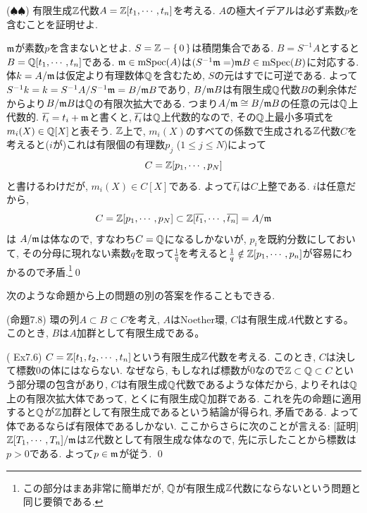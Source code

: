 \begin{egprob} ($\spadesuit\spadesuit$)
有限生成$\mathbb{Z}$代数$A=\mathbb{Z}[t_1,\cdots, t_n]$を考える. $A$の極大イデアルは必ず素数$p$を含むことを証明せよ.
\end{egprob}
\begin{egans}
$\mathfrak{m}$が素数$p$を含まないとせよ. $S=\mathbb{Z}-\set{0}$は積閉集合である. $B=S^{-1}A$とすると$B=\mathbb{Q}[t_1,\cdots,t_n]$である. $\mathfrak{m}\in \mathrm{mSpec}(A)$は$(S^{-1}\mathfrak{m} =) \mathfrak{m}B \in \mathrm{mSpec}(B)$に対応する. 体$k=A/\mathfrak{m}$は仮定より有理数体$\mathbb{Q}$を含むため, $S$の元はすでに可逆である. よって$S^{-1}k = k = S^{-1}A/S^{-1}\mathfrak{m} = B/\mathfrak{m}B$であり, $B/\mathfrak{m}B$は有限生成$\mathbb{Q}$代数$B$の剰余体だからより$B/\mathfrak{m}B$は$\mathbb{Q}$の有限次拡大である. つまり$A/\mathfrak{m} \cong B/\mathfrak{m}B$の任意の元は$\mathbb{Q}$上代数的. $\overline{t_i} = t_i + \mathfrak{m}$と書くと, $\overline{t_i}$は$\mathbb{Q}$上代数的なので, その$\mathbb{Q}$上最小多項式を$m_i(X)\in \mathbb{Q}[X]$と表そう. $\mathbb{Z}$上で, $m_i(X)$のすべての係数で生成される$\mathbb{Z}$代数$C$を考えると($i$が)これは有限個の有理数$p_j$ ($1\leq j\leq N$)によって
\[C=\mathbb{Z}[p_1,\cdots, p_N]\]
と書けるわけだが, $m_i(X)\in C[X]$である. よって$\overline{t_i}$は$C$上整である. $i$は任意だから,
\[C = \mathbb{Z}[p_1,\cdots, p_N] \subset \mathbb{Z}[\overline{t_1},\cdots, \overline{t_n}] = A/\mathfrak{m}\]
は $A/\mathfrak{m}$は体なので,  すなわち$C=\mathbb{Q}$になるしかないが, $p_i$を既約分数にしておいて, その分母に現れない素数$q$を取って$\frac{1}{q}$を考えると$\frac{1}{q} \notin \mathbb{Z}[p_1,\cdots, p_n]$が容易にわかるので矛盾.\footnote{この部分はまあ非常に簡単だが, $\mathbb{Q}$が有限生成$\mathbb{Z}$代数にならないという問題と同じ要領である.}\qed
\end{egans}

次のような命題から上の問題の別の答案を作ることもできる.

\begin{prop} (\cite{atiyah}命題7.8)
環の列$A\subset B\subset C$を考え, $A$はNoether環,  $C$は有限生成$A$代数とする。このとき, $B$は$A$加群として有限生成である。
\end{prop}

\begin{eg} (\cite{atiyah} Ex7.6)
$C=\mathbb{Z}[t_1,t_2,\cdots, t_n]$という有限生成$\mathbb{Z}$代数を考える. このとき, $C$は決して標数0の体にはならない. なぜなら, もしなれば標数が$0$なので$\mathbb{Z}\subset \mathbb{Q}\subset C$という部分環の包含があり, $C$は有限生成$\mathbb{Q}$代数であるような体だから, よりそれは$\mathbb{Q}$上の有限次拡大体であって, とくに有限生成$\mathbb{Q}$加群である.  これを先の命題に適用すると$\mathbb{Q}$が$\mathbb{Z}$加群として有限生成であるという結論が得られ, 矛盾である. よって体であるならば有限体であるしかない. ここからさらに次のことが言える: [証明] $\mathbb{Z}[T_1,\cdots, T_n]/\mathfrak{m}$は$\mathbb{Z}$代数として有限生成な体なので, 先に示したことから標数は$p>0$である. よって$p\in \mathfrak{m}$が従う. \qed
\end{eg}


